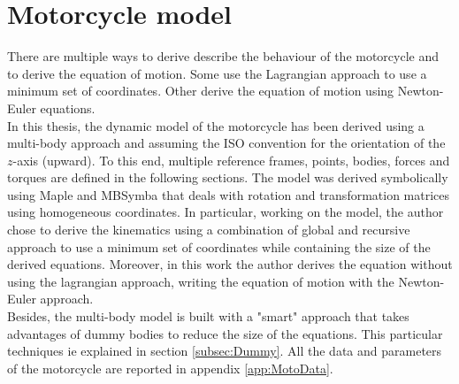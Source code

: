 \chapter{Motorcycle model} 
\label{Ch:MotorcycleModel}
%
There are multiple ways to derive describe the behaviour of the motorcycle and to derive the equation of motion. Some use the Lagrangian approach to use a minimum set of coordinates\cite{pacejka2006tyre,sharp2004advances,leonelli2019optimal}. Other derive the equation of motion using Newton-Euler equations.\\
In this thesis, the dynamic model of the motorcycle has been derived using a multi-body approach and assuming the ISO convention for the orientation of the $z$-axis (upward). To this end, multiple reference frames, points, bodies, forces and torques are defined in the following sections. The model was derived symbolically using Maple and MBSymba that deals with rotation and transformation matrices using homogeneous coordinates. In particular, working on the model, the author chose to derive the kinematics using a combination of global and recursive approach to use a minimum set of coordinates while containing the size of the derived equations. Moreover, in this work the author derives the equation without using the lagrangian approach, writing the equation of motion with the Newton-Euler approach.\\
Besides, the multi-body model is built with a "smart" approach that takes advantages of dummy bodies to reduce the size of the equations. This particular techniques ie explained in section \ref{subsec:Dummy}. All the data and parameters of the motorcycle are reported in appendix \ref{app:MotoData}.
% 



